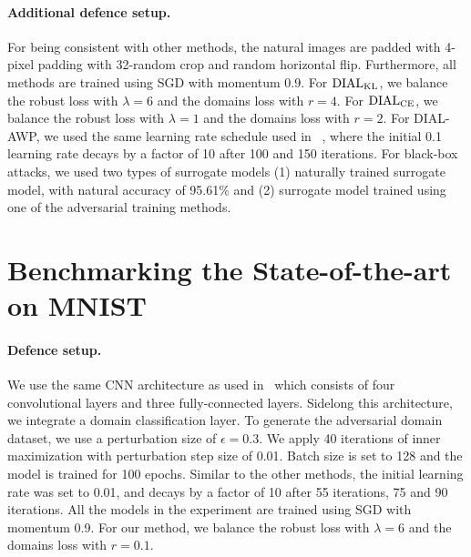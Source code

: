 \paragraph{Additional defence setup.} For being consistent with other methods, the natural images are padded with 4-pixel padding with 32-random crop and random horizontal flip. Furthermore, all methods are trained using SGD with momentum 0.9. For $\operatorname{DIAL}_{\operatorname{KL}}$, we balance the robust loss with $\lambda=6$ and the domains loss with $r=4$. For $\operatorname{DIAL}_{\operatorname{CE}}$, we balance the robust loss with $\lambda=1$ and the domains loss with $r=2$. 
For DIAL-AWP, we used the same learning rate schedule used in ~\cite{wu2020adversarial}, where the initial 0.1 learning rate decays by a factor of 10 after 100 and 150 iterations. For black-box attacks, we used two types of surrogate models (1) naturally trained surrogate model, with natural accuracy of 95.61\% and (2) surrogate model trained using one of the adversarial training methods.

\section{Benchmarking the State-of-the-art on MNIST}
\label{mnist-results}
\paragraph{Defence setup.} We use the same CNN architecture as used in~\cite{zhang2019theoretically} which consists of four convolutional layers and three fully-connected layers. Sidelong this architecture, we integrate a domain classification layer. To generate the adversarial domain dataset, we use a perturbation size of $\epsilon=0.3$. We apply 40 iterations of inner maximization with perturbation step size of 0.01. Batch size is set to 128 and the model is trained for 100 epochs. Similar to the other methods, the initial learning rate was set to 0.01, and decays by a factor of 10 after 55 iterations, 75 and 90 iterations. All the models in the experiment are trained using SGD with momentum 0.9. For our method, we balance the robust loss with $\lambda=6$ and the domains loss with $r=0.1$. 

